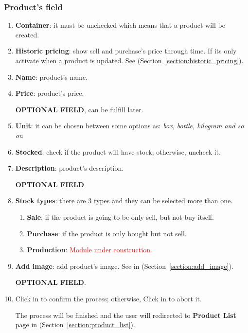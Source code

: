 \documentclass[a4paper,11pt]{refart}
\newcommand\InConstruction{\textcolor{red}{Module under construction.}}
\begin{document}
\subsubsection{Product's field}
\begin{enumerate}
	\item \textbf{Container}: it must be unchecked which means that a product will be created.	
	\item \textbf{Historic pricing}: show sell and purchase's price through time. If its only activate when a product is updated. See (Section~\ref{section:historic_pricing}).
	\item \textbf{Name}: product's name.
	\item \textbf{Price}: product's price.
		\medskip
		\begin{leftbar}
			\textbf{OPTIONAL FIELD}, can be fulfill later.
		\end{leftbar}
	\item \textbf{Unit}: it can be chosen between some options as: \emph{box, bottle, kilogram and so on}
	\item \textbf{Stocked}: check if the product will have stock; otherwise, uncheck it.
	\item \textbf{Description}: product's description.
		\medskip
		\begin{leftbar}
			\textbf{OPTIONAL FIELD}
		\end{leftbar}
	\item \textbf{Stock types}: there are 3 types and they can be selected more than one.
		\begin{enumerate}
			\item \textbf{Sale}: if the product is going to be only sell, but not buy itself.
			\item \textbf{Purchase}: if the product is only bought but not sell.
			\item \textbf{Production}:  \InConstruction{}
		\end{enumerate}
	\item \textbf{Add image}: add product's image. See in (Section~\ref{section:add_image}).
		\medskip
		\begin{leftbar}
			\textbf{OPTIONAL FIELD}.
		\end{leftbar}
	\item Click in  to confirm the process; otherwise, Click in  to abort it.
		\medskip
		\begin{leftbar}
			The process will be finished and the user will redirected to \textbf{Product List} page in (Section~\ref{section:product_list}).

\end{leftbar}
\end{enumerate}
\end{document}
